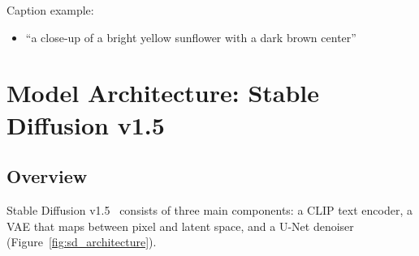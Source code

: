\documentclass[11pt]{article}
\begin{document}
Caption example:
\begin{itemize}
    \item ``a close-up of a bright yellow sunflower with a dark brown center''
\end{itemize}

\section{Model Architecture: Stable Diffusion v1.5}

\subsection{Overview}

Stable Diffusion v1.5~\cite{rombach2021high} consists of three main components: a CLIP text encoder, a VAE that maps between pixel and latent space, and a U-Net denoiser (Figure~\ref{fig:sd_architecture}).
\end{document}
